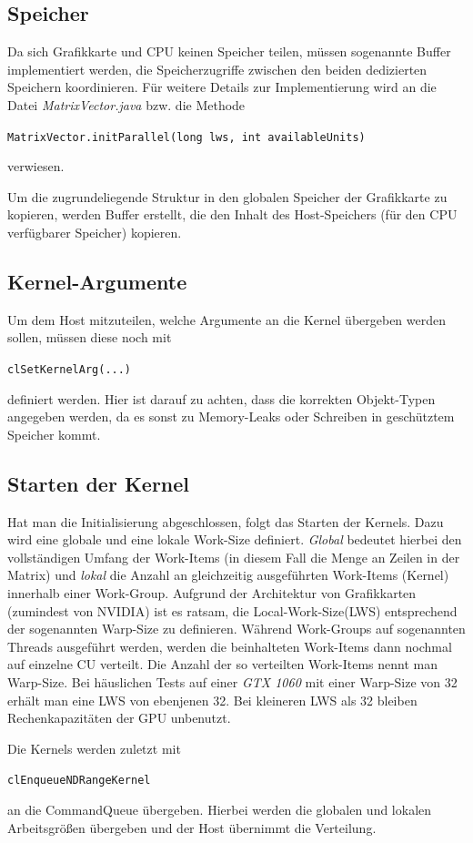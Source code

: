 \documentclass[
	ngerman,
	ruledheaders=section,
	class=report,
	thesis={type=Dokumentation},
	ignore-missing-data=true,
	accentcolor=9c,
	custommargins=false,
	marginpar=false,
	parskip=half-,
	fontsize=11pt,
]{tudapub}
\let\code\texttt
\def\code#1{\begin{small}\texttt{#1}\end{small}}
\begin{document}
\subsection{Speicher}
Da sich Grafikkarte und CPU keinen Speicher teilen, müssen sogenannte Buffer implementiert werden, die Speicherzugriffe zwischen den beiden dedizierten Speichern koordinieren. Für weitere Details zur Implementierung wird an die Datei \textit{MatrixVector.java} bzw. die Methode \code{MatrixVector.initParallel(long lws, int availableUnits)} verwiesen.

Um die zugrundeliegende Struktur in den globalen Speicher der Grafikkarte zu kopieren, werden Buffer erstellt, die den Inhalt des Host-Speichers (für den CPU verfügbarer Speicher) kopieren.

\subsection{Kernel-Argumente}
Um dem Host mitzuteilen, welche Argumente an die Kernel übergeben werden sollen, müssen diese noch mit \code{clSetKernelArg(...)} definiert werden. Hier ist darauf zu achten, dass die korrekten Objekt-Typen angegeben werden, da es sonst zu Memory-Leaks oder Schreiben in geschütztem Speicher kommt.

\subsection{Starten der Kernel}
Hat man die Initialisierung abgeschlossen, folgt das Starten der Kernels. Dazu wird eine globale und eine lokale Work-Size definiert. \textit{Global} bedeutet hierbei den vollständigen Umfang der Work-Items (in diesem Fall die Menge an Zeilen in der Matrix) und \textit{lokal} die Anzahl an gleichzeitig ausgeführten Work-Items (Kernel) innerhalb einer Work-Group. Aufgrund der Architektur von Grafikkarten (zumindest von NVIDIA) ist es ratsam, die Local-Work-Size(LWS) entsprechend der sogenannten Warp-Size zu definieren. Während Work-Groups auf sogenannten Threads ausgeführt werden, werden die beinhalteten Work-Items dann nochmal auf einzelne CU verteilt. Die Anzahl der so verteilten Work-Items nennt man Warp-Size. Bei häuslichen Tests auf einer \textit{GTX 1060} mit einer Warp-Size von 32 erhält man eine LWS von ebenjenen 32. Bei kleineren LWS als 32 bleiben Rechenkapazitäten der GPU unbenutzt.

Die Kernels werden zuletzt mit \code{clEnqueueNDRangeKernel} an die CommandQueue übergeben. Hierbei werden die globalen und lokalen Arbeitsgrößen übergeben und der Host übernimmt die Verteilung.
\end{document}
